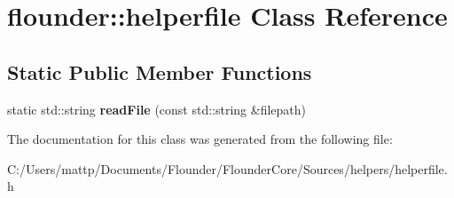 \hypertarget{classflounder_1_1helperfile}{}\section{flounder\+:\+:helperfile Class Reference}
\label{classflounder_1_1helperfile}
\subsection*{Static Public Member Functions}
\begin{DoxyCompactItemize}
\item 
\mbox{\label{classflounder_1_1helperfile_a3e0cf9aeb402172757a2ee2bf22a4c7f}} 
static std\+::string {\bfseries read\+File} (const std\+::string \&filepath)
\end{DoxyCompactItemize}


The documentation for this class was generated from the following file\+:\begin{DoxyCompactItemize}
\item 
C\+:/\+Users/mattp/\+Documents/\+Flounder/\+Flounder\+Core/\+Sources/helpers/helperfile.\+h\end{DoxyCompactItemize}
